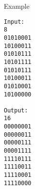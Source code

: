 Example
\begin{verbatim}
Input:
8
01010001
10100011
01010111
10101111
01010111
10100011
01010001
10100000

Output:
16
00000001
00000011
00000111
00001111
11110111
11110011
11110001
11110000
\end{verbatim}